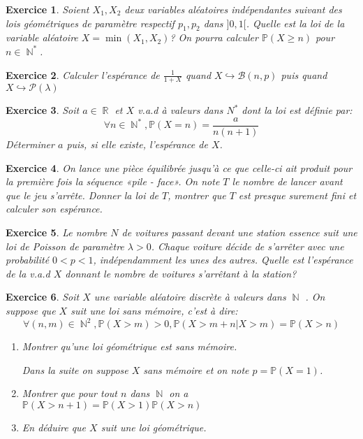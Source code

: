 \documentclass[12pt,a4paper]{article}
\DeclareMathOperator{\R}{\mathbb{R}}
\DeclareMathOperator{\N}{\mathbb{N}}
\newtheorem{Exo}{Exercice}
\renewcommand{\Pr}{\mathbb{P}}
\begin{document}
\begin{Exo}
	Soient $X_1,X_2$ deux variables aléatoires indépendantes suivant des  lois géométriques de paramètre respectif $p_1,p_2$ dans $]0,1[$. Quelle est la loi de la variable aléatoire $X=\min(X_1,X_2)$? On pourra calculer $\Pr(X\geqslant n)$ pour $n\in\N^*$.
\end{Exo}


\begin{Exo}
	 Calculer l’espérance de $\frac{1}{1+X}$ quand 	$X\hookrightarrow \mathcal{B}(n,p)$ puis quand $X\hookrightarrow \mathcal{P}(\lambda)$
\end{Exo}
 


\begin{Exo}
	 Soit $a\in\R$ et $X$ v.a.d à valeurs dans $N^*$ dont la loi
est définie par:
\[\forall n\in\N^*,\Pr(X=n)=\frac{a}{n(n+1)}\]
Déterminer $a$ puis, si elle existe, l'espérance de $X$.
\end{Exo}


\begin{Exo}
	 On lance une pièce équilibrée jusqu’à ce que celle-ci ait produit pour
la première fois la séquence «pile - face». On note $T$ le nombre de lancer avant que le jeu s’arrête. Donner la loi de $T$, montrer que $T$ est presque surement fini et calculer son espérance.

\end{Exo}

\begin{Exo}
	Le nombre $N$ de voitures passant devant une station essence suit une loi de Poisson de paramètre $\lambda>0$. Chaque voiture décide de s'arrêter avec une probabilité $0<p<1$, indépendamment les unes des autres. Quelle est l'espérance de la v.a.d $X$ donnant le nombre de voitures s'arrêtant à la station?
\end{Exo}


\begin{Exo}
	Soit $X$ une variable aléatoire discrète à valeurs dans $\N$ . On suppose que $X$ suit une loi sans mémoire, c’est à dire:
$$\forall (n,m)\in \N^2,\Pr(X>m)>0,\Pr\left(X>m+n|X>m\right)=\Pr(X>n)$$
\begin{enumerate}
	\item Montrer qu’une loi géométrique est sans mémoire.
	
	Dans la suite on suppose $X$ sans mémoire et on note $p=\Pr(X=1)$.

	\item Montrer que pour tout $n$ dans $\N$ on a $\Pr(X>n+1)=\Pr(X>1)\Pr(X>n)$
	\item En déduire que $X$ suit une loi géométrique.
\end{enumerate}
\end{Exo}
\end{document}
